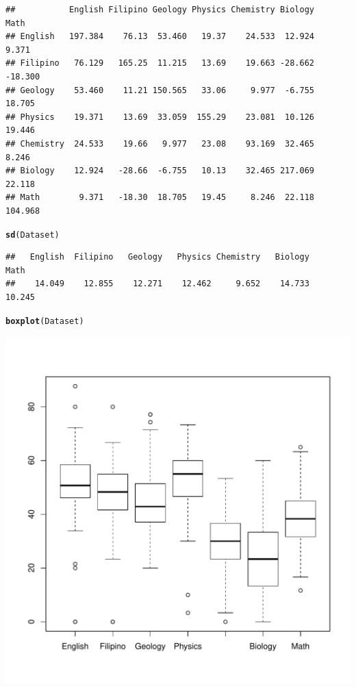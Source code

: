 \documentclass{article}\usepackage{graphicx, color}
\makeatletter
\def\maxwidth{ %
  \ifdim\Gin@nat@width>\linewidth
    \linewidth
  \else
    \Gin@nat@width
  \fi
}
\newcommand{\hlfunctioncall}[1]{\textcolor[rgb]{0.501960784313725,0,0.329411764705882}{\textbf{#1}}}%
\newenvironment{kframe}{%
 \def\at@end@of@kframe{}%
 \ifinner\ifhmode%
  \def\at@end@of@kframe{\end{minipage}}%
  \begin{minipage}{\columnwidth}%
 \fi\fi%
 \def\FrameCommand##1{\hskip\@totalleftmargin \hskip-\fboxsep
 \colorbox{shadecolor}{##1}\hskip-\fboxsep
     \hskip-\linewidth \hskip-\@totalleftmargin \hskip\columnwidth}%
 \MakeFramed {\advance\hsize-\width
   \@totalleftmargin\z@ \linewidth\hsize
   \@setminipage}}%
 {\par\unskip\endMakeFramed%
 \at@end@of@kframe}
\newenvironment{knitrout}{}{} %
\makeatother
\begin{document}
\begin{knitrout}
\begin{kframe}
\begin{verbatim}
##           English Filipino Geology Physics Chemistry Biology    Math
## English   197.384    76.13  53.460   19.37    24.533  12.924   9.371
## Filipino   76.129   165.25  11.215   13.69    19.663 -28.662 -18.300
## Geology    53.460    11.21 150.565   33.06     9.977  -6.755  18.705
## Physics    19.371    13.69  33.059  155.29    23.081  10.126  19.446
## Chemistry  24.533    19.66   9.977   23.08    93.169  32.465   8.246
## Biology    12.924   -28.66  -6.755   10.13    32.465 217.069  22.118
## Math        9.371   -18.30  18.705   19.45     8.246  22.118 104.968
\end{verbatim}
\begin{alltt}
\hlfunctioncall{sd}(Dataset)
\end{alltt}


{\ttfamily\noindent\color{warningcolor}{\#\# Warning: sd(<data.frame>) is deprecated.\\\#\#\ \ Use sapply(*, sd) instead.}}\begin{verbatim}
##   English  Filipino   Geology   Physics Chemistry   Biology      Math 
##    14.049    12.855    12.271    12.462     9.652    14.733    10.245
\end{verbatim}
\begin{alltt}
\hlfunctioncall{boxplot}(Dataset)
\end{alltt}
\end{kframe}
\includegraphics[width=\maxwidth]{figure/wehehehe} 

\end{knitrout}
\end{document}
